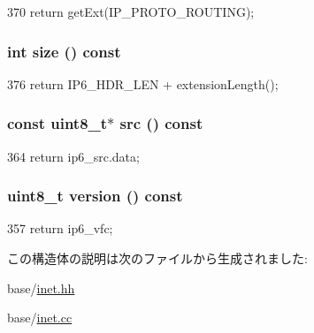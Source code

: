 \begin{DoxyCode}
370 { return getExt(IP_PROTO_ROUTING); }
\end{DoxyCode}
\hypertarget{structNet_1_1Ip6Hdr_ab8e4e3e2a7bf18888b71bdf9dda0770b}{
\subsubsection[{size}]{\setlength{\rightskip}{0pt plus 5cm}int size () const}}
\label{structNet_1_1Ip6Hdr_ab8e4e3e2a7bf18888b71bdf9dda0770b}



\begin{DoxyCode}
376 { return IP6_HDR_LEN + extensionLength(); }
\end{DoxyCode}
\hypertarget{structNet_1_1Ip6Hdr_ac89e62d050ac7229700d8a59b0e2b29d}{
\subsubsection[{src}]{\setlength{\rightskip}{0pt plus 5cm}const uint8\_\-t$\ast$ src () const}}
\label{structNet_1_1Ip6Hdr_ac89e62d050ac7229700d8a59b0e2b29d}



\begin{DoxyCode}
364 { return ip6_src.data; }
\end{DoxyCode}
\hypertarget{structNet_1_1Ip6Hdr_aa3599d88ee3f2dd92bec653b3a607b6b}{
\subsubsection[{version}]{\setlength{\rightskip}{0pt plus 5cm}uint8\_\-t version () const}}
\label{structNet_1_1Ip6Hdr_aa3599d88ee3f2dd92bec653b3a607b6b}



\begin{DoxyCode}
357 { return ip6_vfc; }
\end{DoxyCode}


この構造体の説明は次のファイルから生成されました:\begin{DoxyCompactItemize}
\item 
base/\hyperlink{inet_8hh}{inet.hh}\item 
base/\hyperlink{inet_8cc}{inet.cc}\end{DoxyCompactItemize}
